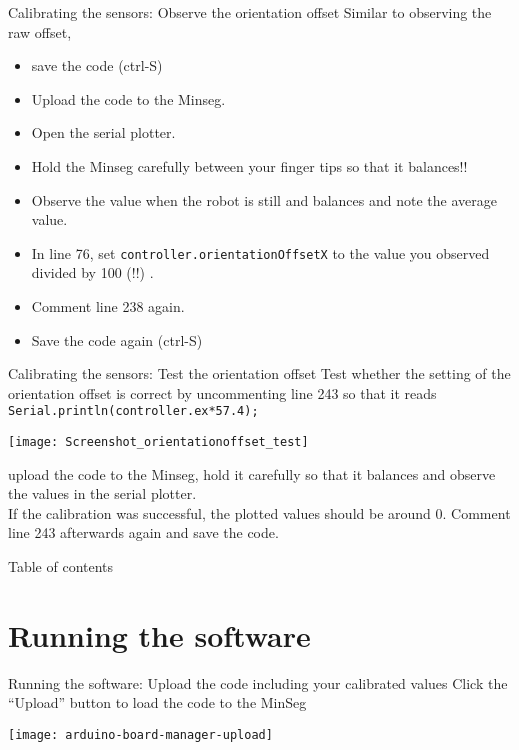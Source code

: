 \begin{frame}{Calibrating the sensors: Observe the orientation offset}
	Similar to observing the raw offset,
	\begin{itemize}
		\item save the code (ctrl-S)
		\item Upload the code to the Minseg.
		\item Open the serial plotter.
		\item Hold the Minseg carefully between your finger tips so that it balances!!
		\item Observe the value when the robot is still and balances and note the average value.
		\item In line 76, set \texttt{controller.orientationOffsetX} to the value you observed divided by 100 (!!) .
		\item Comment line 238 again.
		\item Save the code again (ctrl-S)
		\end{itemize}
\end{frame}

\begin{frame}{Calibrating the sensors: Test the orientation offset}
	Test whether the setting of the orientation offset is correct by uncommenting line 243 so that it reads
	\texttt{Serial.println(controller.ex*57.4);}
	\begin{center}
		\texttt{[image: Screenshot\_orientationoffset\_test]}
	\end{center}
	upload the code to the Minseg, hold it carefully so that it balances and observe the values in the serial plotter.\\
	If the calibration was successful, the plotted values should be around 0. Comment line 243 afterwards again and save the code.
\end{frame}


\begin{frame}{Table of contents}
	\tableofcontents
\end{frame}

\section{Running the software}

\begin{frame}{Running the software: Upload the code including your calibrated values}
	Click the ``Upload'' button to load the code to the MinSeg
	\begin{center}
		\texttt{[image: arduino-board-manager-upload]}
	\end{center}
\end{frame}





